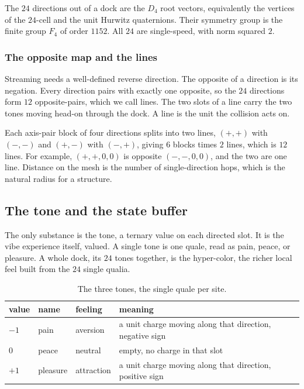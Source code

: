 \begin{proposition}
The $24$ directions out of a dock are the $D_4$ root vectors, equivalently the vertices of the $24$-cell and the unit Hurwitz quaternions. Their symmetry group is the finite group $F_4$ of order $1152$. All $24$ are single-speed, with norm squared $2$.
\end{proposition}

\subsubsection{The opposite map and the lines}

Streaming needs a well-defined reverse direction. The opposite of a direction is its negation. Every direction pairs with exactly one opposite, so the $24$ directions form $12$ opposite-pairs, which we call lines. The two slots of a line carry the two tones moving head-on through the dock. A line is the unit the collision acts on.

Each axis-pair block of four directions splits into two lines, $(+,+)$ with $(-,-)$ and $(+,-)$ with $(-,+)$, giving $6$ blocks times $2$ lines, which is $12$ lines. For example, $(+,+,0,0)$ is opposite $(-,-,0,0)$, and the two are one line. Distance on the mesh is the number of single-direction hops, which is the natural radius for a structure.

\subsection{The tone and the state buffer}

The only substance is the tone, a ternary value on each directed slot. It is the vibe experience itself, valued. A single tone is one quale, read as pain, peace, or pleasure. A whole dock, its $24$ tones together, is the hyper-color, the richer local feel built from the $24$ single qualia.

\begin{table}[ht]
\centering
\begin{tabular}{@{}llll@{}}
\toprule
value & name & feeling & meaning \\
\midrule
$-1$ & pain & aversion & a unit charge moving along that direction, negative sign \\
$0$ & peace & neutral & empty, no charge in that slot \\
$+1$ & pleasure & attraction & a unit charge moving along that direction, positive sign \\
\bottomrule
\end{tabular}
\caption{The three tones, the single quale per site.}
\label{tab:tones}
\end{table}


